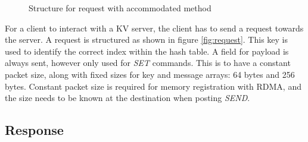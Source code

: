 \begin{figure}
    \centering
    \caption{Structure for request with accommodated method}
\end{figure}

For a client to interact with a KV server, the client has to send a request towards the server.
A request is structured as shown in figure \ref{fig:request}.
This key is used to identify the correct index within the hash table.
A field for payload is always sent, however only used for \textit{SET} commands.
This is to have a constant packet size, along with fixed sizes for key and message arrays: 64 bytes and 256 bytes.
Constant packet size is required for memory registration with RDMA, and the size needs to be known at the destination when posting \textit{SEND}.

\subsection{Response}

